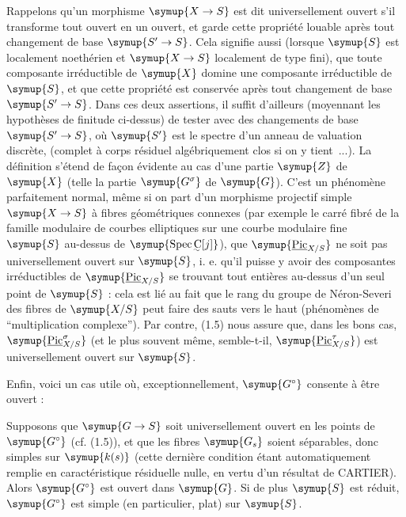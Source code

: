  Rappelons qu'un morphisme $\symup{X\to  S}$ est dit
universellement ouvert s'il transforme tout ouvert en un ouvert, et garde cette
propriété louable après tout changement de base $\symup{S'\to  S}$. Cela
signifie aussi (lorsque $\symup{S}$ est localement noethérien et $\symup{X\to  S}$
localement de type fini), que toute composante irréductible de $\symup{X}$ domine une composante irréductible de $\symup{S}$,
et que cette propriété est conservée après tout changement de base
$\symup{S'\to  S}$. Dans ces deux assertions, il suffit d'ailleurs
(moyennant les hypothèses de finitude ci-dessus) de tester avec des changements
de base $\symup{S'\to  S}$, où $\symup{S'}$ est le spectre d'un anneau de valuation
discrète, (complet à corps résiduel algébriquement clos si on y tient~...). La
définition s'étend de façon évidente au cas d'une partie $\symup{Z}$ de $\symup{X}$ (telle la
partie $\symup{G^\sigma}$ de $\symup{G}$). C'est un phénomène parfaitement normal, même si on
part d'un morphisme projectif simple $\symup{X\to  S}$ à fibres
géométriques connexes (par exemple le carré fibré de la famille modulaire de
courbes elliptiques sur une courbe modulaire fine $\symup{S}$ au-dessus de $\symup{\operatorname{Spec}\text{\uwave{C}}[j]}$), que
$\symup{\underline{\operatorname{Pic}}_{X/S}}$ ne soit pas universellement ouvert sur $\symup{S}$, i. e.
qu'il puisse y avoir des composantes irréductibles de
$\symup{\underline{\operatorname{Pic}}_{X/S}}$ se trouvant tout entières au-dessus d'un seul point
de $\symup{S}$ : cela est lié au fait que le rang du groupe de Néron-Severi des fibres
de $\symup{X/S}$ peut faire des sauts vers le haut (phénomènes de ``multiplication complexe''). Par contre, (1.5) nous assure que, dans les bons cas,
$\symup{\underline{\operatorname{Pic}}_{X/S}^\sigma}$ (et le plus souvent même, semble-t-il,
$\symup{\underline{\operatorname{Pic}}_{X/S}^\tau}$) est universellement ouvert sur $\symup{S}$.

Enfin, voici un cas utile où, exceptionnellement, $\symup{G^\circ}$ consente à être
ouvert :

 Supposons que $\symup{G\to S}$ soit
universellement ouvert en les points de $\symup{G^\circ}$ (cf. (1.5)), et que les
fibres $\symup{G_s}$ soient séparables, donc simples sur $\symup{k(s)}$ (cette dernière
condition étant automatiquement remplie en caractéristique résiduelle nulle,
en vertu d'un résultat de CARTIER). Alors $\symup{G^\circ}$ est ouvert dans $\symup{G}$. Si de
plus $\symup{S}$ est réduit, $\symup{G^\circ}$ est simple (en particulier, plat) sur $\symup{S}$.

